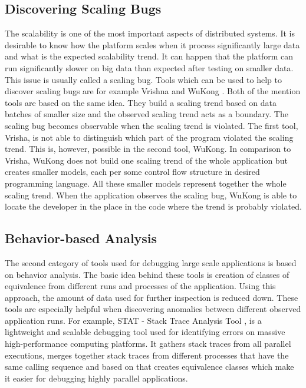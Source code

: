 \subsection{Discovering Scaling Bugs}
The scalability is one of the most important aspects of distributed systems. It is desirable to know how the platform scales when it process significantly large data and what is the expected scalability trend. It can happen that the platform can run significantly slower on big data than expected after testing on smaller data. This issue is usually called a scaling bug. Tools which can be used to help to discover scaling bugs are for example Vrishna and WuKong \cite{HPC}. Both of the mention tools are based on the same idea. They build a scaling trend based on data batches of smaller size and the observed scaling trend acts as a boundary. The scaling bug becomes observable when the scaling trend is violated. The first tool, Vrisha, is not able to distinguish which part of the program violated the scaling trend. This is, however, possible in the second tool, WuKong. In comparison to Vrisha, WuKong does not build one scaling trend of the whole application but creates smaller models, each per some control flow structure in desired programming language. All these smaller models represent together the whole scaling trend. When the application observes the scaling bug, WuKong is able to locate the developer in the place in the code where the trend is probably violated.

\subsection{Behavior-based Analysis}
The second category of tools used for debugging large scale applications is based on behavior analysis. The basic idea behind these tools is creation of classes of equivalence from different runs and processes of the application. Using this approach, the amount of data used for further inspection is reduced down. These tools are especially helpful when discovering anomalies between different observed application runs. For example, STAT - Stack Trace Analysis Tool \cite{HPC}, is a lightweight and scalable debugging tool used for identifying errors on massive high-performance computing platforms. It gathers stack traces from all parallel executions, merges together stack traces from different processes that have the same calling sequence and based on that creates equivalence classes which make it easier for debugging highly parallel applications. 


